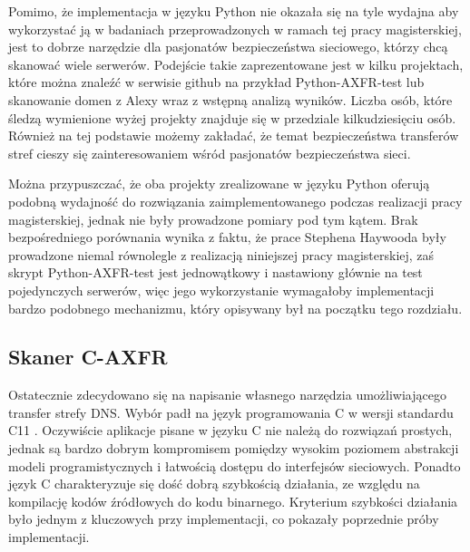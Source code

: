 Pomimo, że implementacja w języku Python nie okazała się na tyle wydajna aby wykorzystać ją w badaniach przeprowadzonych w ramach tej pracy magisterskiej, jest to dobrze narzędzie dla pasjonatów bezpieczeństwa sieciowego, którzy chcą skanować wiele serwerów. Podejście takie zaprezentowane jest w kilku projektach, które można znaleźć w serwisie github na przykład Python-AXFR-test\cite{python-axfr-test} lub skanowanie domen z Alexy wraz z wstępną analizą wyników\cite{asg-axfr}. Liczba osób, które śledzą wymienione wyżej projekty znajduje się w przedziale kilkudziesięciu osób. Również na tej podstawie możemy zakładać, że temat bezpieczeństwa transferów stref cieszy się zainteresowaniem wśród pasjonatów bezpieczeństwa sieci.

Można przypuszczać, że oba projekty zrealizowane w języku Python \cite{python-axfr-test, asg-axfr} oferują podobną wydajność do rozwiązania zaimplementowanego podczas realizacji pracy magisterskiej, jednak nie były prowadzone pomiary pod tym kątem. Brak bezpośredniego porównania wynika z faktu, że prace Stephena Haywooda\cite{asg-axfr} były prowadzone niemal równolegle z realizacją niniejszej pracy magisterskiej, zaś skrypt Python-AXFR-test\cite{python-axfr-test} jest jednowątkowy i nastawiony głównie na test pojedynczych serwerów, więc jego wykorzystanie wymagałoby implementacji bardzo podobnego mechanizmu, który opisywany był na początku tego rozdziału.

\subsection{Skaner C-AXFR}
Ostatecznie zdecydowano się na napisanie własnego narzędzia umożliwiającego transfer strefy DNS. Wybór padł na język programowania C \cite{Kernighan:1988:CPL:576122} w wersji standardu C11 \cite{ISO9899}. Oczywiście aplikacje pisane w języku C nie należą do rozwiązań prostych, jednak są bardzo dobrym kompromisem pomiędzy wysokim poziomem abstrakcji modeli programistycznych i łatwością dostępu do interfejsów sieciowych. Ponadto język C charakteryzuje się dość dobrą szybkością działania, ze względu na kompilację kodów źródłowych do kodu binarnego. Kryterium szybkości działania było jednym z kluczowych przy implementacji, co pokazały poprzednie próby implementacji.

